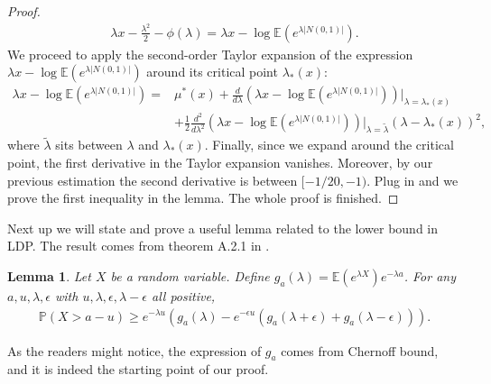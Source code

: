 \documentclass[10pt]{article}
\newcommand{\e}{\mathbb{E}}
\newcommand{\p}{\mathbb{P}}
\newtheorem{lemma}{\bf Lemma}
\newenvironment{Proof of lemma}{\noindent{\bf Proof of Lemma}}{\hfill$\Box$\newline}
\newenvironment{Proof of claim}{\noindent{\bf Proof of claim}}{\hfill$\Box$\newline}
\newenvironment{Proof of theorem}{\noindent{\bf Proof of Theorem}}{\hfill\scriptsize{$\Box$}\newline}
\newenvironment{Proof of theorems}{\noindent{\bf Proof of Theorems}}{\hfill$\Box$\newline}
\newenvironment{Proof of proposition}{\noindent{\bf Proof of Proposition}}{\hfill$\Box$\newline}
\newenvironment{Proof of propositions}{\noindent{\bf Proof of Propositions}}{\hfill$\Box$\newline}
\newenvironment{Proof of exercise}{\noindent{\it Proof of Exercise:}}{\hfill$\Box$}
\numberwithin{equation}{section}
\begin{document}
\begin{proof}
        \begin{align}
            \lambda x -\frac{\lambda^2}{2} - \phi(\lambda) = \lambda x  - \log \e(e^{\lambda |N(0,1)|}).
        \end{align}
        We proceed to apply the second-order Taylor expansion of the expression $\lambda x  - \log \e(e^{\lambda |N(0,1)|})$ around its critical point $\lambda_*(x)$:
        \begin{align}
            \lambda x  - \log \e(e^{\lambda |N(0,1)|}) =& \mu^*(x) + \frac{d}{d \lambda} (\lambda x  - \log \e(e^{\lambda |N(0,1)|}))|_{\lambda = \lambda_*(x)} \nonumber  \\
            &+ \frac{1}{2}\frac{d^2}{d \lambda^2} (\lambda x  - \log \e(e^{\lambda |N(0,1)|}))|_{\lambda = \tilde{\lambda}}(\lambda - \lambda_*(x))^2,
        \end{align}
        where $\tilde{\lambda}$ sits between $\lambda$ and $\lambda_*(x)$. Finally, since we expand around the critical point, the first derivative in the Taylor expansion vanishes. Moreover, by our previous estimation the second derivative is between $[-1/20,-1)$. Plug in and we prove the first inequality in the lemma. The whole proof is finished.
\end{proof}
Next up we will state and prove a useful lemma related to the lower bound in LDP. The result comes from theorem A.2.1 in \cite{Prob_Method_Book}.
\begin{lemma} \label{lowerbdd_lemma}
    Let $X$ be a random variable. Define $g_a(\lambda) = \e(e^{\lambda X}) e^{-\lambda a}$. For any $a,u,\lambda,\epsilon$ with $u,\lambda,\epsilon,\lambda-\epsilon$ all positive,
    \begin{align}
        \p(X>a-u) \geq e^{-\lambda u}(g_a(\lambda)-e^{-\epsilon u}(g_a(\lambda+\epsilon)+g_a(\lambda-\epsilon))).
    \end{align}
\end{lemma}
As the readers might notice, the expression of $g_a$ comes from Chernoff bound, and it is indeed the starting point of our proof.
\end{document}
